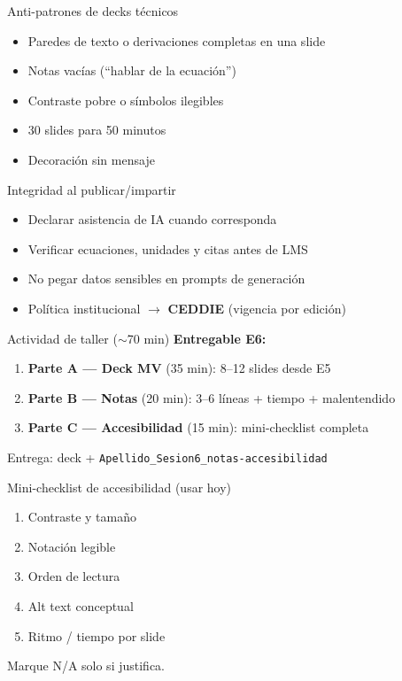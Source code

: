 \documentclass[aspectratio=169,11pt]{beamer}
\begin{document}
\begin{frame}{Anti-patrones de decks técnicos}
\begin{itemize}
\item Paredes de texto o derivaciones completas en una slide
\item Notas vacías (``hablar de la ecuación'')
\item Contraste pobre o símbolos ilegibles
\item 30 slides para 50 minutos
\item Decoración sin mensaje
\end{itemize}
\end{frame}

\begin{frame}{Integridad al publicar/impartir}
\begin{itemize}
\item Declarar asistencia de IA cuando corresponda
\item Verificar ecuaciones, unidades y citas antes de LMS
\item No pegar datos sensibles en prompts de generación
\item Política institucional $\rightarrow$ \textbf{CEDDIE} (vigencia por edición)
\end{itemize}
\end{frame}

\begin{frame}{Actividad de taller ($\sim$70 min)}
\textbf{Entregable E6:}
\begin{enumerate}
\item \textbf{Parte A --- Deck MV} (35 min): 8--12 slides desde E5
\item \textbf{Parte B --- Notas} (20 min): 3--6 líneas + tiempo + malentendido
\item \textbf{Parte C --- Accesibilidad} (15 min): mini-checklist completa
\end{enumerate}
Entrega: deck + \texttt{Apellido\_Sesion6\_notas-accesibilidad}
\end{frame}

\begin{frame}{Mini-checklist de accesibilidad (usar hoy)}
\begin{enumerate}
\item Contraste y tamaño
\item Notación legible
\item Orden de lectura
\item Alt text conceptual
\item Ritmo / tiempo por slide
\end{enumerate}
Marque N/A solo si justifica.
\end{frame}
\end{document}
